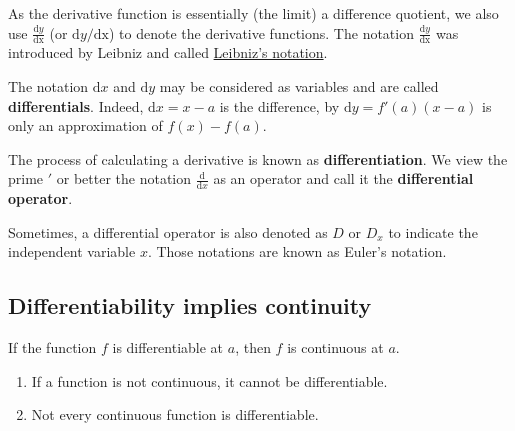 As the derivative function is essentially (the limit) a difference
quotient, we also use \(\frac{\mathrm{d}y}{\mathrm{d x}}\) (or
\(\mathrm{d}y/\mathrm{d x}\)) to denote the derivative functions. The
notation \(\frac{\mathrm{d}y}{\mathrm{d x}}\) was introduced by Leibniz
and called
\href{https://en.wikipedia.org/wiki/Leibniz\%27s_notation}{Leibniz's
notation}.

\begin{remark}
The notation \(\mathrm{d} x\) and \(\mathrm{d} y\) may be considered as
variables and are called \textbf{differentials}. Indeed,
\(\mathrm{d} x=x-a\) is the difference, by \(\mathrm{d}y = f'(a)(x-a)\)
is only an approximation of \(f(x)-f(a)\).
\end{remark}

The process of calculating a derivative is known as
\textbf{differentiation}. We view the prime \('\) or better the notation
\(\frac{\mathrm{d}}{\mathrm{d}x}\) as an operator and call it the
\textbf{differential operator}.

Sometimes, a differential operator is also denoted as \(D\) or \(D_x\)
to indicate the independent variable \(x\). Those notations are known as
Euler's notation.

\hypertarget{differentiability-implies-continuity}{%
\subsection{Differentiability implies
continuity}\label{differentiability-implies-continuity}}

\begin{theorem}
If the function \(f\) is differentiable at \(a\), then \(f\) is
continuous at \(a\).
\end{theorem}

\begin{remark}
\begin{enumerate}[sepno]
\item
  If a function is not continuous, it cannot be differentiable.
\item
  Not every continuous function is differentiable.
\end{enumerate}
\end{remark}

